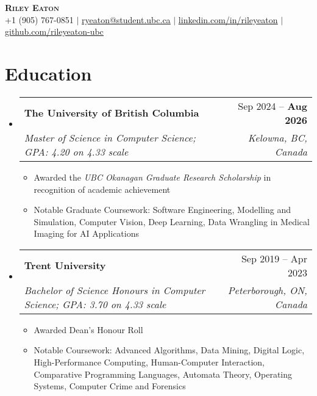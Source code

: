 \documentclass[letterpaper,11.5pt]{article}
\makeatletter
\newcommand{\resumeItem}[1]{
  \item\small{
    {#1 \vspace{-2pt}}
  }
}
\newcommand{\resumeSubheading}[4]{
  \vspace{-2pt}\item
    \begin{tabular*}{0.97\textwidth}[t]{l@{\extracolsep{\fill}}r}
      \textbf{#1} & #2 \\
      \textit{\small#3} & \textit{\small #4} \\
    \end{tabular*}\vspace{-7pt}
}
\newcommand{\resumeSubHeadingListStart}{\begin{itemize}[leftmargin=0.15in, label={}]}
\newcommand{\resumeSubHeadingListEnd}{\end{itemize}}
\newcommand{\resumeItemListStart}{\begin{itemize}}
\newcommand{\resumeItemListEnd}{\end{itemize}\vspace{-5pt}}
\def\iconSpace{0.5pt}
\makeatother
\begin{document}
\begin{center}
    \textbf{\Huge \scshape Riley Eaton} \\ \vspace{1pt}
    \small \faPhoneSquare \hspace{\iconSpace} +1 (905) 767-0851
    $|$ \faEnvelope \hspace{\iconSpace} \href{mailto:ryeaton@student.ubc.ca}{\underline{ryeaton@student.ubc.ca}} 
    $|$ \faLinkedinSquare \hspace{\iconSpace} \href{https://linkedin.com/in/rileyeaton}{\underline{linkedin.com/in/rileyeaton}} 
    $|$ \faGithub \hspace{\iconSpace} \href{https://github.com/rileyeaton-ubc}{\underline{github.com/rileyeaton-ubc}}
\end{center}

\section{Education}
  \resumeSubHeadingListStart
    \resumeSubheading
      {The University of British Columbia}{Sep 2024 -- \textbf{Aug 2026}}
      {Master of Science in Computer Science; GPA: 4.20 on 4.33 scale}{Kelowna, BC, Canada}
      \resumeItemListStart
        \resumeItem{Awarded the \emph{UBC Okanagan Graduate Research Scholarship} in recognition of academic achievement}
        \resumeItem{Notable Graduate Coursework: Software Engineering, Modelling and Simulation, Computer Vision, Deep Learning, Data Wrangling in Medical Imaging for AI Applications}
      \resumeItemListEnd
    \resumeSubheading
      {Trent University}{Sep 2019 -- Apr 2023}
      {Bachelor of Science Honours in Computer Science; GPA: 3.70 on 4.33 scale}{Peterborough, ON, Canada}
      \resumeItemListStart
        \resumeItem{Awarded Dean's Honour Roll}
        \resumeItem{Notable Coursework: Advanced Algorithms, Data Mining, Digital Logic, High-Performance Computing, Human-Computer Interaction, Comparative Programming Languages, Automata Theory, Operating Systems, Computer Crime and Forensics}
      \resumeItemListEnd
  \resumeSubHeadingListEnd

\end{document}
